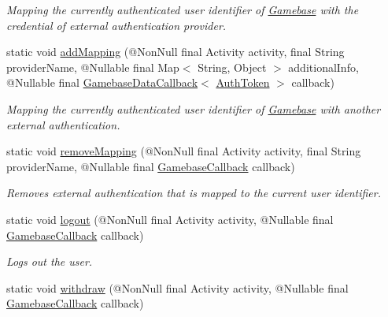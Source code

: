 \begin{DoxyCompactItemize}
\begin{DoxyCompactList}\small\item\em Mapping the currently authenticated user identifier of \hyperlink{classcom_1_1toast_1_1android_1_1gamebase_1_1_gamebase}{Gamebase} with the credential of external authentication provider. \end{DoxyCompactList}\item 
static void \hyperlink{classcom_1_1toast_1_1android_1_1gamebase_1_1_gamebase_a1c4ce31da795ee62dbbbb1446809f092}{add\+Mapping} (@Non\+Null final Activity activity, final String provider\+Name, @Nullable final Map$<$ String, Object $>$ additional\+Info, @Nullable final \hyperlink{interfacecom_1_1toast_1_1android_1_1gamebase_1_1_gamebase_data_callback}{Gamebase\+Data\+Callback}$<$ \hyperlink{classcom_1_1toast_1_1android_1_1gamebase_1_1auth_1_1data_1_1_auth_token}{Auth\+Token} $>$ callback)
\begin{DoxyCompactList}\small\item\em Mapping the currently authenticated user identifier of \hyperlink{classcom_1_1toast_1_1android_1_1gamebase_1_1_gamebase}{Gamebase} with another external authentication. \end{DoxyCompactList}\item 
static void \hyperlink{classcom_1_1toast_1_1android_1_1gamebase_1_1_gamebase_a0349c553fad7eb3fb4bdd0da8cebe311}{remove\+Mapping} (@Non\+Null final Activity activity, final String provider\+Name, @Nullable final \hyperlink{interfacecom_1_1toast_1_1android_1_1gamebase_1_1_gamebase_callback}{Gamebase\+Callback} callback)
\begin{DoxyCompactList}\small\item\em Removes external authentication that is mapped to the current user identifier. \end{DoxyCompactList}\item 
static void \hyperlink{classcom_1_1toast_1_1android_1_1gamebase_1_1_gamebase_a46e0cbaa0ed64f4c0eb66e137bfcf4d4}{logout} (@Non\+Null final Activity activity, @Nullable final \hyperlink{interfacecom_1_1toast_1_1android_1_1gamebase_1_1_gamebase_callback}{Gamebase\+Callback} callback)
\begin{DoxyCompactList}\small\item\em Logs out the user. \end{DoxyCompactList}\item 
static void \hyperlink{classcom_1_1toast_1_1android_1_1gamebase_1_1_gamebase_aaa0ce688f5b145c64fb3cc3ec7d496c7}{withdraw} (@Non\+Null final Activity activity, @Nullable final \hyperlink{interfacecom_1_1toast_1_1android_1_1gamebase_1_1_gamebase_callback}{Gamebase\+Callback} callback)

\end{DoxyCompactItemize}
